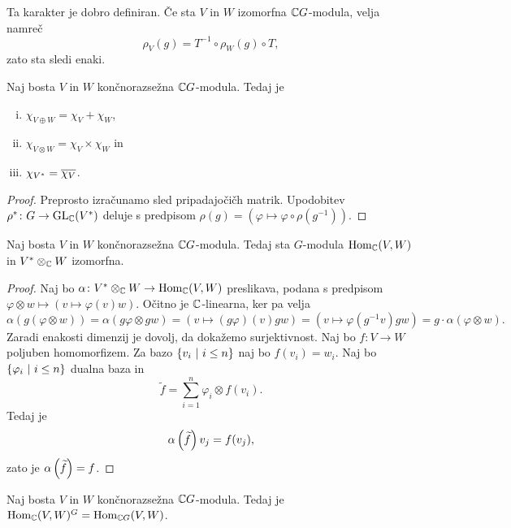 \begin{opomba}
Ta karakter je dobro definiran. Če sta $V$ in $W$ izomorfna
$\mathbb{C} G$-modula, velja namreč
\[
\rho_V(g) = T^{-1} \circ \rho_W(g) \circ T,
\]
zato sta sledi enaki.
\end{opomba}

\begin{trditev}
Naj bosta $V$ in $W$ končnorazsežna $\mathbb{C} G$-modula. Tedaj je

\begin{enumerate}[i)]
\item $\chi_{V \oplus W} = \chi_V + \chi_W$,
\item $\chi_{V \otimes W} = \chi_V \times \chi_W$ in
\item $\chi_{V^*} = \overline{\chi_V}$.
\end{enumerate}
\end{trditev}

\begin{proof}
Preprosto izračunamo sled pripadajočičh matrik. Upodobitev
$\rho^* \colon G \to \operatorname{GL}_{\mathbb{C}}(V^*)$ deluje s predpisom
$\rho(g) = (\varphi \mapsto \varphi \circ \rho(g^{-1}))$.
\end{proof}

\begin{lema}
Naj bosta $V$ in $W$ končnorazsežna $\mathbb{C} G$-modula. Tedaj sta
$G$-modula $\operatorname{Hom}_{\mathbb{C}}(V, W)$ in $V^* \otimes_{\mathbb{C}} W$ izomorfna.
\end{lema}

\begin{proof}
Naj bo $\alpha \colon V^* \otimes_{\mathbb{C}} W \to \operatorname{Hom}_{\mathbb{C}}(V, W)$
preslikava, podana s predpisom
$\varphi \otimes w \mapsto (v \mapsto \varphi(v) w)$. Očitno je
$\mathbb{C}$-linearna, ker pa velja
\[
\alpha(g (\varphi \otimes w)) =
\alpha(g \varphi \otimes gw) =
(v \mapsto (g \varphi)(v) gw) =
(v \mapsto \varphi(g^{-1}v) gw) =
g \cdot \alpha(\varphi \otimes w).
\]
Zaradi enakosti dimenzij je dovolj, da dokažemo surjektivnost. Naj
bo $f \colon V \to W$ poljuben homomorfizem. Za bazo
$\left\{v_i~\middle\vert~i \leq n\right\}$ naj bo $f(v_i) = w_i$. Naj bo
$\left\{\varphi_i~\middle\vert~i \leq n\right\}$ dualna baza in
\[
\widetilde{f} = \sum_{i=1}^n \varphi_i \otimes f(v_i).
\]
Tedaj je
\[
\alpha \left(\widetilde{f}\right) v_j = f(v_j),
\]
zato je $\alpha \left(\widetilde{f}\right) = f$.
\end{proof}

\begin{lema}
Naj bosta $V$ in $W$ končnorazsežna $\mathbb{C} G$-modula. Tedaj je
$\operatorname{Hom}_{\mathbb{C}}(V, W)^G = \operatorname{Hom}_{\mathbb{C} G}(V, W)$.
\end{lema}

